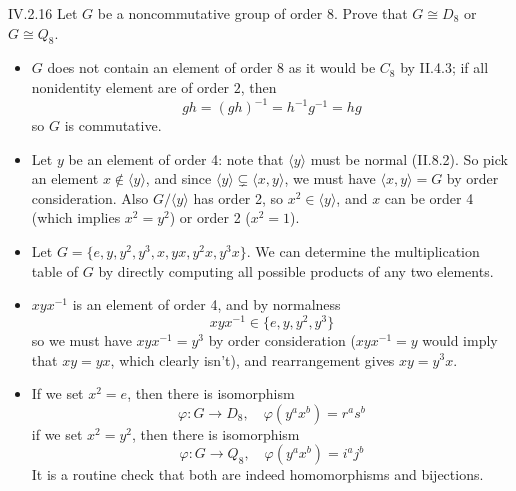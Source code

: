 \begin{problem}{IV.2.16}
Let $G$ be a noncommutative group of order 8. Prove that $G \cong D_8$ or $G \cong Q_8$.
\end{problem}
\begin{pf}
\begin{itemize}
	\setlength\itemsep{0pt}
	\item $G$ does not contain an element of order $8$ as it would be $C_8$ by II.4.3; if all nonidentity element are of order $2$, then 
	\[
	gh = {(gh)}^{-1} = h^{-1}g^{-1} = hg
	\]
	so $G$ is commutative.
	\item Let $y$ be an element of order 4: note that $\langle y \rangle$ must be normal (II.8.2). So pick an element $x \notin \langle y \rangle$, and since $\langle y \rangle \subsetneq \langle x,y \rangle$, we must have $\langle x,y \rangle = G$ by order consideration. Also $G/\langle y \rangle$ has order 2, so $x^2 \in \langle y \rangle$, and $x$ can be order 4 (which implies $x^2 = y^2$) or order 2 ($x^2 = 1$).
	\item Let $G = \{e,y,y^2,y^3,x,yx,y^2x,y^3x\}$. We can determine the multiplication table of $G$ by directly computing all possible products of any two elements.
	\item $xyx^{-1}$ is an element of order 4, and by normalness
	\[
	xyx^{-1} \in \{e,y,y^2,y^3\}
	\]
	so we must have $xyx^{-1} = y^3$ by order consideration ($xyx^{-1} = y$ would imply that $xy = yx$, which clearly isn't), and rearrangement gives $xy = y^3x$.
	\item If we set $x^2 = e$, then there is isomorphism
	\[
	\varphi: G \to D_8, \quad \varphi(y^ax^b) = r^as^b	
	\]
	if we set $x^2 = y^2$, then there is isomorphism
	\[
	\varphi: G \to Q_8, \quad \varphi(y^ax^b) = i^aj^b
	\]
	It is a routine check that both are indeed homomorphisms and bijections.
\end{itemize}
\end{pf}

